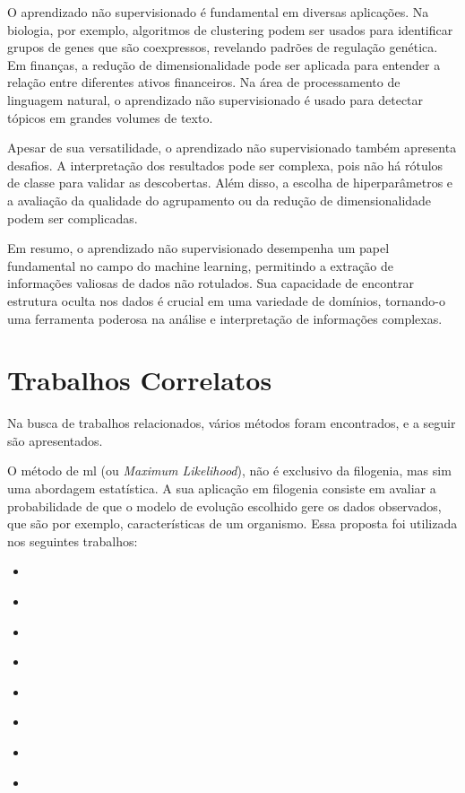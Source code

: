 O aprendizado não supervisionado é fundamental em diversas aplicações. Na biologia, por exemplo, algoritmos de clustering podem ser usados para identificar grupos de genes que são coexpressos, revelando padrões de regulação genética. Em finanças, a redução de dimensionalidade pode ser aplicada para entender a relação entre diferentes ativos financeiros. Na área de processamento de linguagem natural, o aprendizado não supervisionado é usado para detectar tópicos em grandes volumes de texto.

Apesar de sua versatilidade, o aprendizado não supervisionado também apresenta desafios. A interpretação dos resultados pode ser complexa, pois não há rótulos de classe para validar as descobertas. Além disso, a escolha de hiperparâmetros e a avaliação da qualidade do agrupamento ou da redução de dimensionalidade podem ser complicadas.

Em resumo, o aprendizado não supervisionado desempenha um papel fundamental no campo do machine learning, permitindo a extração de informações valiosas de dados não rotulados. Sua capacidade de encontrar estrutura oculta nos dados é crucial em uma variedade de domínios, tornando-o uma ferramenta poderosa na análise e interpretação de informações complexas.

\section{Trabalhos Correlatos}

Na busca de trabalhos relacionados, vários métodos foram encontrados, e a seguir são apresentados.

O método de \gls{ml} (ou \textit{Maximum Likelihood}), não é exclusivo da filogenia, mas sim uma abordagem estatística. A sua aplicação em filogenia consiste em avaliar a probabilidade de que o modelo de evolução escolhido gere os dados observados, que são por exemplo, características de um organismo. Essa proposta foi utilizada nos seguintes trabalhos:
\begin{itemize}
  \item \citeauthor{behl_threat_2022}
  \item \citeauthor{fall_genetic_diversity_2021}
  \item \citeauthor{shabbir_comprehensive_2020}
  \item \citeauthor{hudu_hepatitis_2018}
  \item \citeauthor{sallard_tracing_2021}
  \item \citeauthor{paez-espino_diversity_evolution_2019}
  \item \citeauthor{tang_evolutionary_2021}
  \item \citeauthor{cho_analysis_2022}
\end{itemize}

